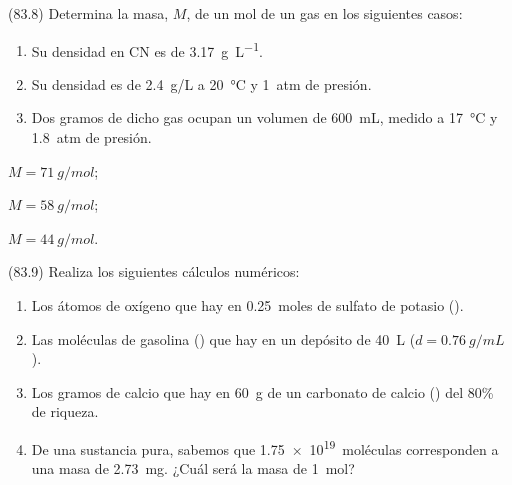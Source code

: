 \documentclass[10pt,a5paper,twoside]{article}
\begin{document}
      \begin{exercise}[
          tags    = {},
          topics  = {química,química básica},
          source  = {FQ 1B MGH 2016, p83, e8},
        ]
        (83.8) Determina la masa, \( M \), de un mol de un gas en los siguientes
        casos:
        \begin{enumerate}
          \item Su densidad en CN es de \SI{3.17}{\gram\per\liter}.
          \item Su densidad es de \SI{2.4}{g/L} a \SI{20}{\celsius} y \SI{1}{atm} de presión.
          \item Dos gramos de dicho gas ocupan un volumen de \SI{600}{\milli\liter}, medido a \SI{17}{\celsius} y \SI{1.8}{atm} de presión.
        \end{enumerate}
      \end{exercise}

      \begin{solution}
        \begin{enumerate*}
          \item \( M = \SI{71}{g/mol} \);
          \item \( M = \SI{58}{g/mol} \);
          \item \( M = \SI{44}{g/mol} \).
          \end{enumerate*}
      \end{solution}




      \begin{exercise}[
          tags    = {},
          topics  = {química,química básica},
          source  = {FQ 1B MGH 2016, p83, e9},
        ]
        (83.9) Realiza los siguientes cálculos numéricos:
        \begin{enumerate}
          \item Los átomos de oxígeno que hay en \SI{0.25}{moles} de sulfato de potasio ().
          \item Las moléculas de gasolina () que hay en un depósito de \SI{40}{\liter} (\( d = \SI{0.76}{g/mL} \)).
          \item Los gramos de calcio que hay en \SI{60}{g} de un carbonato de calcio () del 80\% de riqueza.
          \item De una sustancia pura, sabemos que \SI{1.75e19}{moléculas} corresponden a una masa de \SI{2.73}{mg}. ¿Cuál será la masa de \SI{1}{mol}?
        \end{enumerate}
      \end{exercise}
\end{document}

